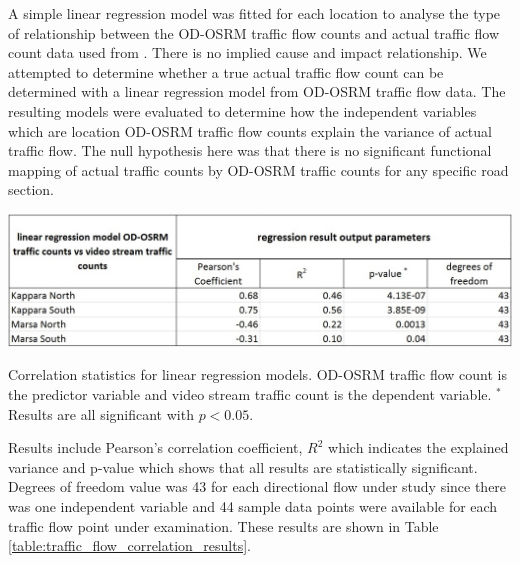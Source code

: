 \documentclass[12pt, a4paper]{report}
\theoremstyle{definition}
\theoremstyle{definition}%
\theoremstyle{definition}%
\theoremstyle{definition}%
\theoremstyle{definition}%
\theoremstyle{definition}%
\begin{document}
A simple linear regression model was fitted for each location to analyse the type of relationship between the OD-OSRM traffic flow counts and actual traffic flow count data used from \cite{Pace2017}. There is no implied cause and impact relationship. We attempted to determine whether a true actual traffic flow count can be determined with a linear regression model from OD-OSRM traffic flow data. The resulting models were evaluated to determine how the independent variables which are location OD-OSRM traffic flow counts explain the variance of actual traffic flow. The null hypothesis here was that there is no significant functional mapping of actual traffic counts by OD-OSRM traffic counts for any specific road section.


\begin{table}[!]	
	\includegraphics[scale=0.4]{traffic_flow_counts_correlation_results.jpg}
	\centering
	\caption[Correlation statistics for traffic flow linear regression models]{Correlation statistics for linear regression models. OD-OSRM traffic flow count is the predictor variable and video stream traffic count is the dependent variable. $^*$Results are all significant with $p < 0.05$.}
	\label{table:traffic_flow_correlation_results}
\end{table}

Results include Pearson's correlation coefficient, $R^2$ which indicates the explained variance and p-value which shows that all results are statistically significant. Degrees of freedom value was 43 for each directional flow under study since there was one independent variable and 44 sample data points were available for each traffic flow point under examination. These results are shown in Table \ref{table:traffic_flow_correlation_results}. 
\end{document}
